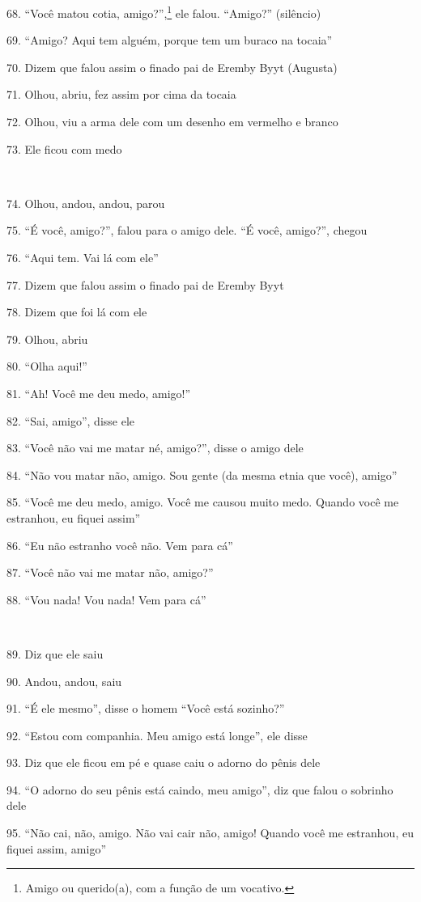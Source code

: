 68. ``Você matou cotia, amigo?'',\footnote{Amigo ou querido(a), com a função
  de um vocativo.} ele falou. ``Amigo?'' (silêncio)

69. ``Amigo? Aqui tem alguém, porque tem um buraco na tocaia''

70. Dizem que falou assim o finado pai de Eremby Byyt (Augusta)

71. Olhou, abriu, fez assim por cima da tocaia

72. Olhou, viu a arma dele com um desenho em vermelho e branco

73. Ele ficou com medo

~

74. Olhou, andou, andou, parou

75. ``É você, amigo?'', falou para o amigo dele. ``É você, amigo?'', chegou

76. ``Aqui tem.  Vai lá com ele''

77. Dizem que falou assim o finado pai de Eremby Byyt

78. Dizem que foi lá com ele

79. Olhou, abriu

80. ``Olha aqui!''

81. ``Ah! Você me deu medo, amigo!''

82. ``Sai, amigo'', disse ele

83. ``Você não vai me matar né, amigo?'', disse o amigo dele

84. ``Não vou matar não, amigo. Sou gente (da mesma etnia que você), amigo''

85. ``Você me deu medo, amigo. Você me causou muito medo. Quando você me
estranhou, eu fiquei assim''

86. ``Eu não estranho você não. Vem para cá''

87. ``Você não vai me matar não, amigo?''

88. ``Vou nada! Vou nada! Vem para cá''

~

89. Diz que ele saiu

90. Andou, andou, saiu

91. ``É ele mesmo'', disse o homem ``Você está sozinho?''

92. ``Estou com companhia. Meu amigo está longe'', ele disse

93. Diz que ele ficou em pé e quase caiu o adorno do pênis dele

94. ``O adorno do seu pênis está caindo, meu amigo'', diz que falou o
sobrinho dele

95. ``Não cai, não, amigo. Não vai cair não, amigo! Quando você me
estranhou, eu fiquei assim, amigo''

